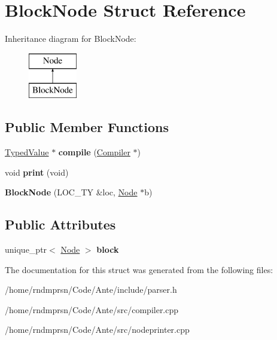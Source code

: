 \hypertarget{structBlockNode}{}\section{Block\+Node Struct Reference}
\label{structBlockNode}
Inheritance diagram for Block\+Node\+:\begin{figure}[H]
\begin{center}
\leavevmode
\includegraphics[height=2.000000cm]{structBlockNode}
\end{center}
\end{figure}
\subsection*{Public Member Functions}
\begin{DoxyCompactItemize}
\item 
\mbox{\label{structBlockNode_a0b3b462ba8eb932825b5b344b3759fb2}} 
\hyperlink{structTypedValue}{Typed\+Value} $\ast$ {\bfseries compile} (\hyperlink{structante_1_1Compiler}{Compiler} $\ast$)
\item 
\mbox{\label{structBlockNode_a80092c2f8031e16b6ccf00a766ec8e0d}} 
void {\bfseries print} (void)
\item 
\mbox{\label{structBlockNode_a50b657367f884e27f929910f300c79eb}} 
{\bfseries Block\+Node} (L\+O\+C\+\_\+\+TY \&loc, \hyperlink{structNode}{Node} $\ast$b)
\end{DoxyCompactItemize}
\subsection*{Public Attributes}
\begin{DoxyCompactItemize}
\item 
\mbox{\label{structBlockNode_a423b4bdd4d1597f18373c6f81dc91a9f}} 
unique\+\_\+ptr$<$ \hyperlink{structNode}{Node} $>$ {\bfseries block}
\end{DoxyCompactItemize}


The documentation for this struct was generated from the following files\+:\begin{DoxyCompactItemize}
\item 
/home/rndmprsn/\+Code/\+Ante/include/parser.\+h\item 
/home/rndmprsn/\+Code/\+Ante/src/compiler.\+cpp\item 
/home/rndmprsn/\+Code/\+Ante/src/nodeprinter.\+cpp\end{DoxyCompactItemize}
